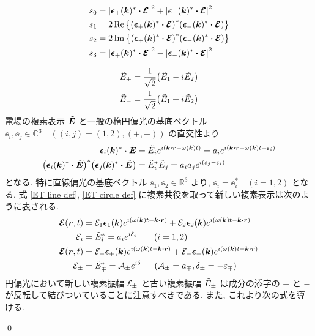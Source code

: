 \documentclass[uplatex,dvipdfmx,a4paper,11pt]{jlreq}
\makeatletter
\newcommand{\CC}{\mathbb{C}}
\newcommand{\RR}{\mathbb{R}}
\newcommand{\rr}{\bm{r}}
\newcommand{\kk}{\bm{k}}
\theoremstyle{definition}
\renewenvironment{proof}[1][\proofname]{\par
  \normalfont
  \topsep6\p@\@plus6\p@ \trivlist
  \item[\hskip\labelsep{\bfseries #1}\@addpunct{\bfseries}]\ignorespaces\quad\par
}{%
  \qed\endtrivlist\@endpefalse
}
\renewcommand\proofname{証明}
\makeatother
\begin{document}
\begin{proposition}
  \begin{align}
    s_0 & = \qty|\ee_+(\kk)^*\vdot\EC|^2 + \qty|\ee_-(\kk)^*\vdot\EC|^2      \\
    s_1 & = 2\Re\qty{\qty(\ee_+(\kk)^*\vdot\EC)^*\qty(\ee_-(\kk)^*\vdot\EC)} \\
    s_2 & = 2\Im\qty{\qty(\ee_+(\kk)^*\vdot\EC)^*\qty(\ee_-(\kk)^*\vdot\EC)} \\
    s_3 & = \qty|\ee_+(\kk)^*\vdot\EC|^2 - \qty|\ee_-(\kk)^*\vdot\EC|^2
  \end{align}
\end{proposition}
\begin{proof}
  \begin{align}
    \tilde{E}_+ & = \frac{1}{\sqrt{2}}\qty(\tilde{E}_1 - i\tilde{E}_2) \\
    \tilde{E}_- & = \frac{1}{\sqrt{2}}\qty(\tilde{E}_1 + i\tilde{E}_2)
  \end{align}
  電場の複素表示 $\tilde{\bm{E}}$ と一般の楕円偏光の基底ベクトル $\ee_i, \ee_j\in\CC^3\quad ((i, j) = (1, 2), (+, -))$ の直交性より
  \begin{align}
    \ee_i(\kk)^*\vdot\ET
     & = \Et_ie^{i(\kk\vdot\rr - \omega(\kk)t)} = a_ie^{i(\kk\vdot\rr - \omega(\kk)t + \varepsilon_i)} \\
    \qty(\ee_i(\kk)^*\vdot\ET)^*\qty(\ee_j(\kk)^*\vdot\ET)
     & = \Et_i^*\Et_j = a_ia_je^{i(\varepsilon_j - \varepsilon_i)} \label{Ei Ej}
  \end{align}
  となる. 特に直線偏光の基底ベクトル $\ee_1, \ee_2\in\RR^3$ より, $\ee_i = \ee_i^*\quad(i=1,2)$ となる.
  式 \eqref{ET line def}, \eqref{ET circle def} に複素共役を取って新しい複素表示は次のように表される.
  \begin{align}
    \EC(\rr, t) & = \Ec_1\ee_1(\kk)e^{i(\omega(\kk)t - \kk\vdot\rr)} + \Ec_2\ee_2(\kk)e^{i(\omega(\kk)t - \kk\vdot\rr)}        \\
    \Ec_i       & = \Et_i^* = a_ie^{i\delta_i} \qquad (i = 1, 2)                                                               \\
    \EC(\rr, t) & = \Ec_+\ee_+(\kk)e^{i(\omega(\kk)t - \kk\vdot\rr)} + \Ec_-\ee_-(\kk)e^{i(\omega(\kk)t - \kk\vdot\rr)}        \\
    \Ec_\pm     & = \Et_\mp^* = \mathcal{A}_\pm e^{i\delta_\pm} \quad (\mathcal{A}_\pm = a_\mp, \delta_\pm = -\varepsilon_\mp)
  \end{align}
  円偏光において新しい複素振幅 $\mathcal{E}_\pm$ と古い複素振幅 $\tilde{E}_\pm$ は成分の添字の $+$ と $-$ が反転して結びついていることに注意すべきである. また, これより次の式を導ける.

\end{proof}
\end{document}
